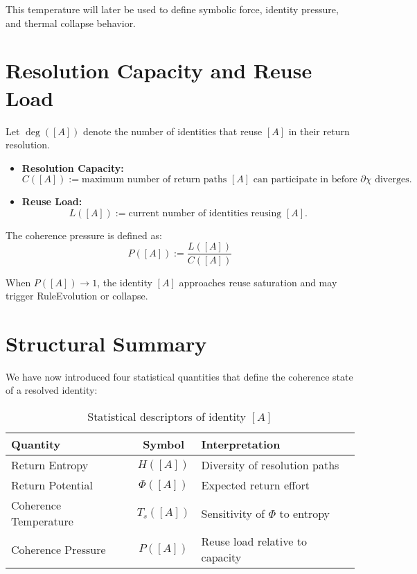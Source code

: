 This temperature will later be used to define symbolic force, identity pressure, and thermal collapse behavior.

\section{Resolution Capacity and Reuse Load} \label{resolution-capacity-and-reuse-load}

Let $\deg([A])$ denote the number of identities that reuse $[A]$ in their return resolution.

\begin{definition}
\begin{itemize}
    \item \textbf{Resolution Capacity:} 
    \[
    C([A]) := \text{maximum number of return paths } [A] \text{ can participate in before } \partial\chi \text{ diverges}.
    \]
    \item \textbf{Reuse Load:}
    \[
    L([A]) := \text{current number of identities reusing } [A].
    \]
\end{itemize}
\end{definition}

\begin{definition} \label{def:coherence-pressure}
The coherence pressure is defined as:
\begin{equation} \label{eq:coherence-pressure}
P([A]) := \frac{L([A])}{C([A])}
\end{equation}
\end{definition}

When $P([A]) \to 1$, the identity $[A]$ approaches reuse saturation and may trigger RuleEvolution or collapse.

\section{Structural Summary} \label{structural-summary}

We have now introduced four statistical quantities that define the coherence state of a resolved identity:

\begin{table}[h!]
\centering
\begin{tabular}{|l|c|l|}
\hline
\textbf{Quantity} & \textbf{Symbol} & \textbf{Interpretation} \\
\hline
Return Entropy         & $H([A])$      & Diversity of resolution paths \\
Return Potential       & $\Phi([A])$   & Expected return effort         \\
Coherence Temperature  & $T_s([A])$    & Sensitivity of $\Phi$ to entropy \\
Coherence Pressure     & $P([A])$      & Reuse load relative to capacity \\
\hline
\end{tabular}
\caption{Statistical descriptors of identity $[A]$}
\end{table}


